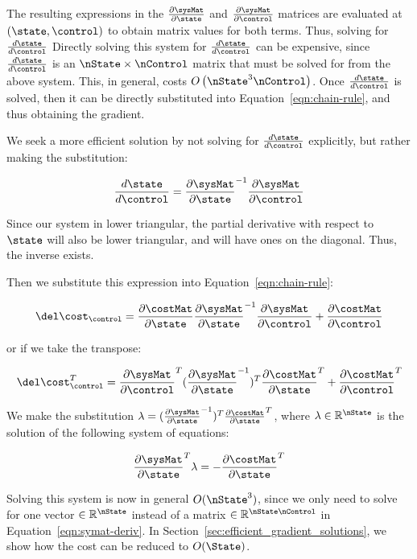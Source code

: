 The resulting expressions in the $\dhdx$ and $\dhdu$ matrices are evaluated at $(\state,\control)$ to obtain matrix values for both terms. Thus, solving for $\dFrac{\state}{\control}$ Directly solving this system for $\dFrac{\state}{\control}$ can be expensive, since $\dFrac{\state}{\control}$ is an $\nState\times\nControl$ matrix that must be solved for from the above system. This, in general, costs $O\left(\nState^3\nControl\right)$. Once $\dFrac{\state}{\control}$ is solved, then it can be directly substituted into Equation~\eqref{eqn:chain-rule}, and thus obtaining the gradient.

We seek a more efficient solution by not solving for $\dFrac{\state}{\control}$ explicitly, but rather making the substitution:

\begin{align}
\label{eqn:inverse}
\dFrac{\state}{\control} = \dhdx^{-1}\dhdu
\end{align}


Since our system in lower triangular, the partial derivative with respect to $\state$ will also be lower triangular, and will have ones on the diagonal. Thus, the inverse exists.

Then we substitute this expression into Equation~\eqref{eqn:chain-rule}:

\begin{align}
\label{eqn:sub}
    \del \cost_{\control} = \djdx \dhdx^{-1}\dhdu +\djdu
\end{align}

or if we take the transpose:

\begin{align}
\label{eqn:sub-transpose}
    \del \cost_{\control}^T = \dhdu^T (\dhdx^{-1})^T \djdx^T +\djdu^T
\end{align}


We make the substitution $\lambda = (\dhdx^{-1})^T \djdx^T$, where $\lambda\in\Rbb^{\nState}$ is the solution of the following system of equations:

\begin{equation}
    \label{eqn:adjoint}
    \dhdx^T \lambda = -\djdx^T
\end{equation}

Solving this system is now in general $O(\nState^3)$, since we only need to solve for one vector $\in \Rbb^{\nState}$ instead of a matrix $\in\Rbb^{\nState\nControl}$ in Equation~\eqref{eqn:symat-deriv}. In Section~\ref{sec:efficient_gradient_solutions}, we show how the cost can be reduced to $O(\State)$.


